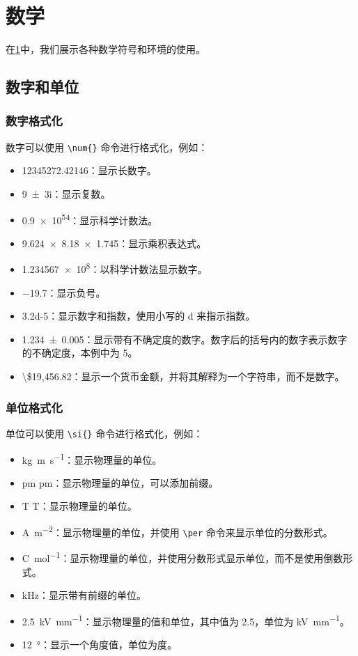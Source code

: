 \section{数学}\label{sec:math}

在\cref{sec:math}中，我们展示各种数学符号和环境的使用。

\subsection{数字和单位}

\subsubsection{数字格式化}

数字可以使用 \verb|\num{}| 命令进行格式化，例如：

\begin{itemize}
\item \num{12345272.42146}：显示长数字。
\item \num{9+-3i}：显示复数。
\item \num{.9e54}：显示科学计数法。
\item \num{9.624 x 8.18 x 1.745}：显示乘积表达式。
\item \num{1.234567e8}：以科学计数法显示数字。
\item \num{-19.7}：显示负号。
\item \num{3.2d-5}：显示数字和指数，使用小写的 d 来指示指数。
\item \num{1.234(5)}：显示带有不确定度的数字。数字后的括号内的数字表示数字的不确定度，本例中为 5。
\item \num[parse-numbers=false]{\$19,456.82}：显示一个货币金额，并将其解释为一个字符串，而不是数字。
\end{itemize}

\subsubsection{单位格式化}

单位可以使用 \verb|\si{}| 命令进行格式化，例如：

\begin{itemize}
\item \si{kg.m.s^{-1}}：显示物理量的单位。
\item \si{\pico\meter} $\si{\pico\meter}$：显示物理量的单位，可以添加前缀。
\item \si{\tesla} $\si{\tesla}$：显示物理量的单位。
\item \si{\ampere\per\meter\squared}：显示物理量的单位，并使用 \verb|\per| 命令来显示单位的分数形式。
\item \si[per-mode=fraction]{\coulomb\per\mole}：显示物理量的单位，并使用分数形式显示单位，而不是使用倒数形式。
\item \si{\kilo\hertz}：显示带有前缀的单位。
\item \SI{2.5}{\kilo\volt\per\milli\meter}：显示物理量的值和单位，其中值为 2.5，单位为 \si{\kilo\volt\per\milli\meter}。
\item \SI{12}{\degree}：显示一个角度值，单位为度。
\end{itemize}

